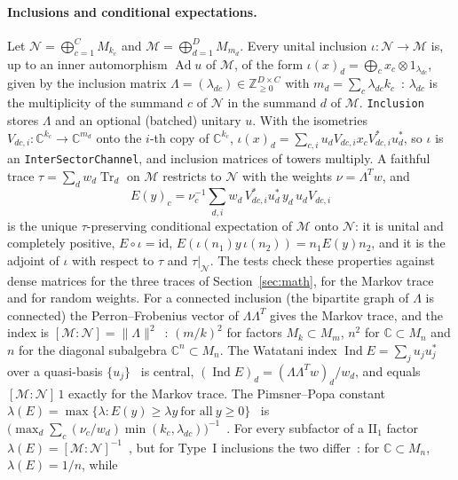 \documentclass[11pt]{article}
\DeclareMathOperator{\Tr}{Tr}
\newcommand{\C}{\mathbb{C}}
\newcommand{\M}{\mathcal{M}}
\begin{document}
\paragraph{Inclusions and conditional expectations.} Let $\mathcal N=\bigoplus_{c=1}^CM_{k_c}$ and
$\M=\bigoplus_{d=1}^DM_{m_d}$. Every unital inclusion $\iota:\mathcal N\to\M$ is, up to an inner automorphism
$\operatorname{Ad}u$ of $\M$, of the form $\iota(x)_d=\bigoplus_cx_c\otimes1_{\lambda_{dc}}$, given by the inclusion
matrix $\Lambda=(\lambda_{dc})\in\mathbb Z_{\ge0}^{D\times C}$ with $m_d=\sum_c\lambda_{dc}k_c$~\cite{ghj1989}:
$\lambda_{dc}$ is the multiplicity of the summand $c$ of $\mathcal N$ in the summand $d$ of $\M$. \texttt{Inclusion}
stores $\Lambda$ and an optional (batched) unitary $u$. With the isometries $V_{dc,i}:\C^{k_c}\to\C^{m_d}$ onto the
$i$-th copy of $\C^{k_c}$, $\iota(x)_d=\sum_{c,i}u_dV_{dc,i}x_cV_{dc,i}^*u_d^*$, so $\iota$ is an
\texttt{InterSectorChannel}, and inclusion matrices of towers multiply. A faithful trace
$\tau=\sum_dw_d\Tr_d$ on $\M$ restricts to $\mathcal N$ with the weights $\nu=\Lambda^Tw$, and
\[
  E(y)_c=\nu_c^{-1}\sum_{d,i}w_d\,V_{dc,i}^*u_d^*\,y_d\,u_dV_{dc,i}
\]
is the unique $\tau$-preserving conditional expectation of $\M$ onto $\mathcal N$: it is unital and completely
positive, $E\circ\iota=\mathrm{id}$, $E(\iota(n_1)y\,\iota(n_2))=n_1E(y)n_2$, and it is the adjoint of $\iota$ with
respect to $\tau$ and $\tau|_{\mathcal N}$. The tests check these properties against dense matrices for the three
traces of Section~\ref{sec:math}, for the Markov trace and for random weights. For a connected inclusion (the bipartite
graph of $\Lambda$ is connected) the Perron--Frobenius vector of $\Lambda\Lambda^T$ gives the Markov trace, and the
index is $[\M:\mathcal N]=\|\Lambda\|^2$~\cite{jones1983,ghj1989}: $(m/k)^2$ for factors $M_k\subset M_m$, $n^2$ for
$\C\subset M_n$ and $n$ for the diagonal subalgebra $\C^n\subset M_n$. The Watatani index
$\operatorname{Ind}E=\sum_ju_ju_j^*$ over a quasi-basis $\{u_j\}$~\cite{watatani1990} is central,
$(\operatorname{Ind}E)_d=(\Lambda\Lambda^Tw)_d/w_d$, and equals $[\M:\mathcal N]\,1$ exactly for the Markov trace. The
Pimsner--Popa constant $\lambda(E)=\max\{\lambda: E(y)\ge\lambda y\ \text{for all}\ y\ge0\}$~\cite{pimsner1986} is
$\bigl(\max_d\sum_c(\nu_c/w_d)\min(k_c,\lambda_{dc})\bigr)^{-1}$~\cite[Theorem~6.1]{pimsner1986}. For every subfactor
of a II$_1$ factor $\lambda(E)=[\M:\mathcal N]^{-1}$~\cite[Theorem~2.2]{pimsner1986}, but for Type~I inclusions the two
differ~\cite[6.5]{pimsner1986}: for $\C\subset M_n$, $\lambda(E)=1/n$, while
\end{document}
